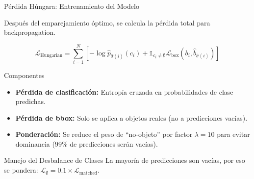 \documentclass[aspectratio=169, 10pt]{beamer}
\begin{document}
\begin{frame}[shrink]{P\'erdida H\'ungara: Entrenamiento del Modelo}

	Despu\'es del emparejamiento \'optimo, se calcula la p\'erdida total para backpropagation.

	\vspace{0.2cm}

	{\small
	\[
	\mathcal{L}_{\text{Hungarian}} = \sum_{i=1}^{N} \left[-\log \hat{p}_{\hat{\sigma}(i)}(c_i) + \mathbb{1}_{c_i \neq \emptyset} \mathcal{L}_{\text{box}}(b_i, \hat{b}_{\hat{\sigma}(i)})\right]
	\]
	}

	\vspace{0.2cm}

	\begin{block}{Componentes}
		\begin{itemize}
			\item \textbf{P\'erdida de clasificaci\'on:} Entrop\'ia cruzada en probabilidades de clase predichas.
			\item \textbf{P\'erdida de bbox:} Solo se aplica a objetos reales (no a predicciones vac\'ias).
			\item \textbf{Ponderaci\'on:} Se reduce el peso de ``no-objeto'' por factor $\lambda = 10$ para evitar dominancia (99\% de predicciones ser\'an vac\'ias).
		\end{itemize}
	\end{block}

	\vspace{0.2cm}

	\begin{alertblock}{Manejo del Desbalance de Clases}
		La mayor\'ia de predicciones son vac\'ias, por eso se pondera: $\mathcal{L}_{\emptyset} = 0.1 \times \mathcal{L}_{\text{matched}}$.
	\end{alertblock}

\end{frame}
\end{document}
